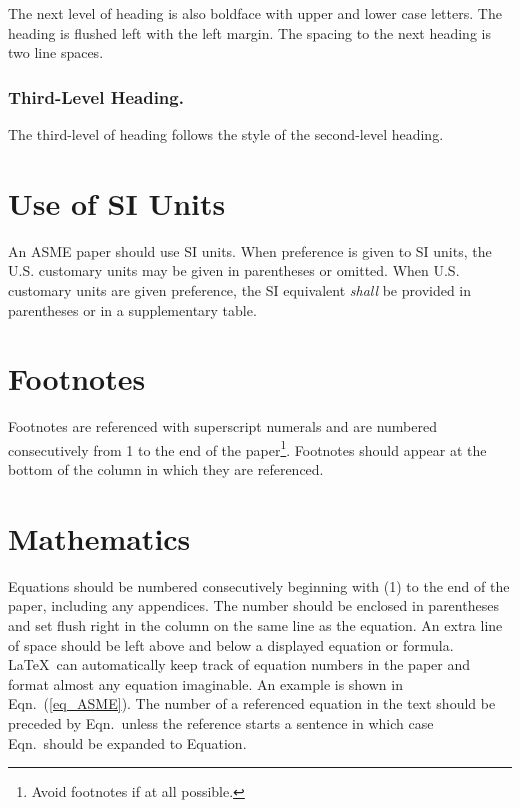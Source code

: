 \documentclass[twocolumn,10pt]{asme2ej}
\begin{document}
The next level of heading is also boldface with upper and lower case letters. 
The heading is flushed left with the left margin. The spacing to the next heading is two line spaces.

\subsubsection{Third-Level Heading.}

The third-level of heading follows the style of the second-level heading.


\section{Use of SI Units}

An ASME paper should use SI units.  When preference is given to SI units, the U.S. customary units may be given in parentheses or omitted. When U.S. customary units are given preference, the SI equivalent {\em shall} be provided in parentheses or in a supplementary table. 

\section{Footnotes\protect\footnotemark}

Footnotes are referenced with superscript numerals and are numbered consecutively from 1 to the end of the paper\footnote{Avoid footnotes if at all possible.}. Footnotes should appear at the bottom of the column in which they are referenced.


\section{Mathematics}

Equations should be numbered consecutively beginning with (1) to the end of the paper, including any appendices.  The number should be enclosed in parentheses and set flush right in the column on the same line as the equation.  An extra line of space should be left above and below a displayed equation or formula. \LaTeX\ can automatically keep track of equation numbers in the paper and format almost any equation imaginable. An example is shown in Eqn.~(\ref{eq_ASME}). The number of a referenced equation in the text should be preceded by Eqn.\ unless the reference starts a sentence in which case Eqn.\ should be expanded to Equation.
\end{document}
